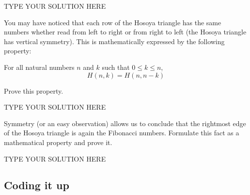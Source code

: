 \documentclass[11pt]{article}
\begin{document}
\begin{solution}
TYPE YOUR SOLUTION HERE
\end{solution}


\begin{task}{3} %
You may have noticed that each row of the Hosoya triangle has the same numbers
whether read from left to right or from right to left (the Hosoya triangle has
vertical symmetry).  This is mathematically expressed by the following
property:

\begin{property}
\label{prop:symmetry}
  For all natural numbers $n$ and $k$ such that $0 \leq k \leq n$,
  $$
  H(n, k) = H(n, n-k)
  $$
\end{property}

Prove this property.
\end{task}

\begin{solution}
TYPE YOUR SOLUTION HERE
\end{solution}


\begin{task}{3} %
Symmetry (or an easy observation) allows us to conclude that the rightmost
edge of the Hosoya triangle is again the Fibonacci numbers.  Formulate this
fact as a mathematical property and prove it.
\end{task}

\begin{solution}
TYPE YOUR SOLUTION HERE
\end{solution}


\subsection{Coding it up}

\addtocounter{taskNum}{1}
\end{document}
